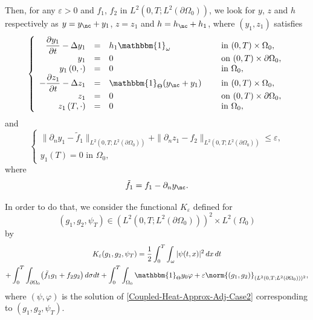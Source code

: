 Then, for any $\varepsilon >0$ and $f_1$, $f_2$ in $L^2(0,T; L^2(\partial \Omega_0))$, we look for $y$, $z$ and $h$ respectively as $y = y_{\nc} + y_1$, $z = z_1$ and $h = h_{\nc} + h_1$, where $(y_1, z_1)$ satisfies
\begin{equation}
\label{y-Omega-1-h}
\left\{
\begin{array}{rcll}
\dfrac{\partial y_1}{\partial t}-\Delta y_1 &=&h_1\mathbbm{1}_{\omega}&\text{ in }(0,T) \times \Omega_0,
\\
y_1 &=& 0 &\text{ on }(0,T) \times \partial \Omega_0,
\\
y_1\left(0,\cdot\right) &=& 0 &\text{ in }\Omega_0,
\\
-\dfrac{\partial z_1}{\partial t}-\Delta z_1 &=&\mathbbm{1}_{\Theta} (y_{\nc} + y_1) \quad&\text{ in }(0,T) \times \Omega_0,
\\
z_1 &=& 0 &\text{ on }(0,T) \times \partial \Omega_0,
\\
z_1\left(T,\cdot\right) &=& 0 &\text{ in }\Omega_0,
\end{array}
\right.
\end{equation}
and
\begin{equation}
\label{Goal-NC-and-Approx-Case-2}
\begin{cases}
\| \partial_n y_1 - \tilde f_1 \|_{L^2(0,T; L^2(\partial\Omega_0))}
+
\| \partial_n z_1 - f_2 \|_{L^2(0,T; L^2(\partial\Omega_0))}
\leq\varepsilon,
\\
y_1(T) = 0 \text{ in } \Omega_0,
\end{cases}
\end{equation}
where
\begin{equation}\label{tilf}
\tilde f_1= f_1 - \partial_n y_{\nc}.
\end{equation}

In order to do that, we consider the functional $K_\varepsilon$ defined for
\[
(g_1, g_2, \psi_T) \in (L^2(0,T; L^2(\partial \Omega_0)))^2 \times L^2(\Omega_0)
\]
by
\begin{multline*}
K_{\varepsilon}(g_1, g_2, \psi_T)
=
\frac{1}{2} \int_0^T \int_\omega |\psi(t,x)|^2 \, dx\,dt
\\
+
\int_0^T \int_{\partial \Omega_0} \bigl(\tilde f_1 g_1 + f_2 g_2 \bigr) \, d\sigma dt
+
\int_0^T \int_{\Omega_0} \mathbbm{1}_{\Theta} y_0 \varphi
+
\varepsilon \norm{(g_1,g_2)}_{(L^2(0,T; L^2(\partial \Omega_0)))^2},
\end{multline*}
where $(\psi, \varphi)$ is the solution of \eqref{Coupled-Heat-Approx-Adj-Case2} {corresponding to $(g_1, g_2, \psi_T)$.}

